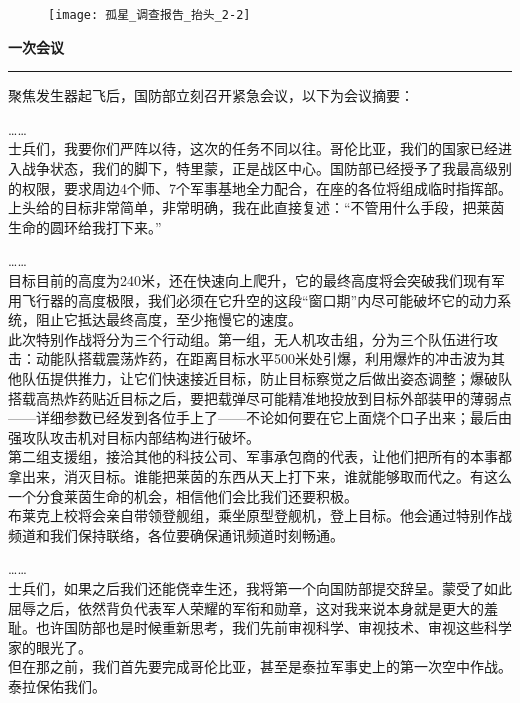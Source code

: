 \documentclass[openany]{book}
\begin{document}
\begin{figure}[h]
    \centering
    \texttt{[image: 孤星\_调查报告\_抬头\_2-2]}
\end{figure}
{\Large\textbf{一次会议}}\par\noindent\rule{\textwidth}{0.4pt}
聚焦发生器起飞后，国防部立刻召开紧急会议，以下为会议摘要：\par
……\\
士兵们，我要你们严阵以待，这次的任务不同以往。哥伦比亚，我们的国家已经进入战争状态，我们的脚下，特里蒙，正是战区中心。国防部已经授予了我最高级别的权限，要求周边4个师、7个军事基地全力配合，在座的各位将组成临时指挥部。上头给的目标非常简单，非常明确，我在此直接复述：“不管用什么手段，把莱茵生命的圆环给我打下来。”\par
……\\
目标目前的高度为240米，还在快速向上爬升，它的最终高度将会突破我们现有军用飞行器的高度极限，我们必须在它升空的这段“窗口期”内尽可能破坏它的动力系统，阻止它抵达最终高度，至少拖慢它的速度。\\
此次特别作战将分为三个行动组。第一组，无人机攻击组，分为三个队伍进行攻击：动能队搭载震荡炸药，在距离目标水平500米处引爆，利用爆炸的冲击波为其他队伍提供推力，让它们快速接近目标，防止目标察觉之后做出姿态调整；爆破队搭载高热炸药贴近目标之后，要把载弹尽可能精准地投放到目标外部装甲的薄弱点——详细参数已经发到各位手上了——不论如何要在它上面烧个口子出来；最后由强攻队攻击机对目标内部结构进行破坏。\\
第二组支援组，接洽其他的科技公司、军事承包商的代表，让他们把所有的本事都拿出来，消灭目标。谁能把莱茵的东西从天上打下来，谁就能够取而代之。有这么一个分食莱茵生命的机会，相信他们会比我们还要积极。\\
布莱克上校将会亲自带领登舰组，乘坐原型登舰机，登上目标。他会通过特别作战频道和我们保持联络，各位要确保通讯频道时刻畅通。\par
……\\
士兵们，如果之后我们还能侥幸生还，我将第一个向国防部提交辞呈。蒙受了如此屈辱之后，依然背负代表军人荣耀的军衔和勋章，这对我来说本身就是更大的羞耻。也许国防部也是时候重新思考，我们先前审视科学、审视技术、审视这些科学家的眼光了。\\
但在那之前，我们首先要完成哥伦比亚，甚至是泰拉军事史上的第一次空中作战。泰拉保佑我们。
\clearpage
\end{document}
